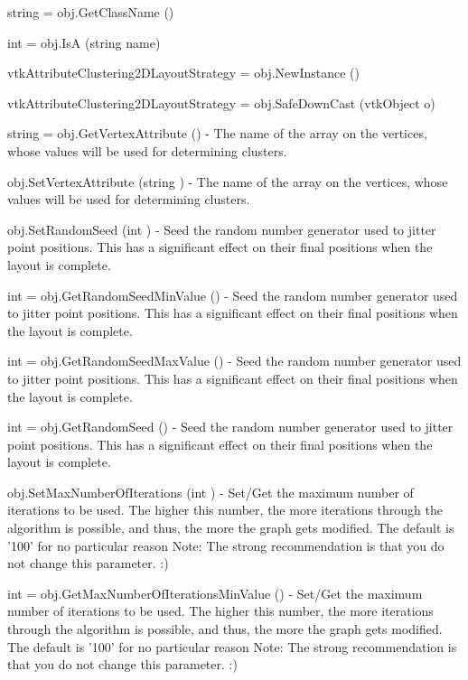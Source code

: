 \begin{DoxyItemize}
\item {\ttfamily string = obj.\-Get\-Class\-Name ()}  
\item {\ttfamily int = obj.\-Is\-A (string name)}  
\item {\ttfamily vtk\-Attribute\-Clustering2\-D\-Layout\-Strategy = obj.\-New\-Instance ()}  
\item {\ttfamily vtk\-Attribute\-Clustering2\-D\-Layout\-Strategy = obj.\-Safe\-Down\-Cast (vtk\-Object o)}  
\item {\ttfamily string = obj.\-Get\-Vertex\-Attribute ()} -\/ The name of the array on the vertices, whose values will be used for determining clusters.  
\item {\ttfamily obj.\-Set\-Vertex\-Attribute (string )} -\/ The name of the array on the vertices, whose values will be used for determining clusters.  
\item {\ttfamily obj.\-Set\-Random\-Seed (int )} -\/ Seed the random number generator used to jitter point positions. This has a significant effect on their final positions when the layout is complete.  
\item {\ttfamily int = obj.\-Get\-Random\-Seed\-Min\-Value ()} -\/ Seed the random number generator used to jitter point positions. This has a significant effect on their final positions when the layout is complete.  
\item {\ttfamily int = obj.\-Get\-Random\-Seed\-Max\-Value ()} -\/ Seed the random number generator used to jitter point positions. This has a significant effect on their final positions when the layout is complete.  
\item {\ttfamily int = obj.\-Get\-Random\-Seed ()} -\/ Seed the random number generator used to jitter point positions. This has a significant effect on their final positions when the layout is complete.  
\item {\ttfamily obj.\-Set\-Max\-Number\-Of\-Iterations (int )} -\/ Set/\-Get the maximum number of iterations to be used. The higher this number, the more iterations through the algorithm is possible, and thus, the more the graph gets modified. The default is '100' for no particular reason Note\-: The strong recommendation is that you do not change this parameter. \-:)  
\item {\ttfamily int = obj.\-Get\-Max\-Number\-Of\-Iterations\-Min\-Value ()} -\/ Set/\-Get the maximum number of iterations to be used. The higher this number, the more iterations through the algorithm is possible, and thus, the more the graph gets modified. The default is '100' for no particular reason Note\-: The strong recommendation is that you do not change this parameter. \-:)  

\end{DoxyItemize}
